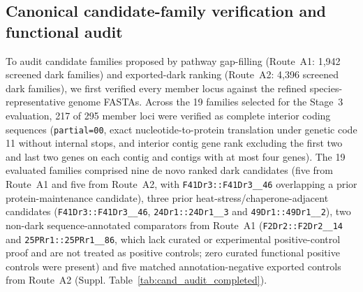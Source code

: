 \subsection*{Canonical candidate-family verification and functional audit}
To audit candidate families proposed by pathway gap-filling (Route~A1: 1,942 screened dark families) and exported-dark ranking (Route~A2: 4,396 screened dark families), we first verified every member locus against the refined species-representative genome FASTAs. Across the 19 families selected for the Stage~3 evaluation, 217 of 295 member loci were verified as complete interior coding sequences (\texttt{partial=00}, exact nucleotide-to-protein translation under genetic code 11 without internal stops, and interior contig gene rank excluding the first two and last two genes on each contig and contigs with at most four genes). The 19 evaluated families comprised nine de novo ranked dark candidates (five from Route~A1 and five from Route~A2, with \texttt{F41Dr3::\allowbreak F41Dr3\_\_46} overlapping a prior protein-maintenance candidate), three prior heat-stress/chaperone-adjacent candidates (\texttt{F41Dr3::\allowbreak F41Dr3\_\_46}, \texttt{24Dr1::\allowbreak 24Dr1\_\_3} and \texttt{49Dr1::\allowbreak 49Dr1\_\_2}), two non-dark sequence-annotated comparators from Route~A1 (\texttt{F2Dr2::\allowbreak F2Dr2\_\_14} and \texttt{25PRr1::\allowbreak 25PRr1\_\_86}, which lack curated or experimental positive-control proof and are not treated as positive controls; zero curated functional positive controls were present) and five matched annotation-negative exported controls from Route~A2 (Suppl. Table~\ref{tab:cand_audit_completed}).

